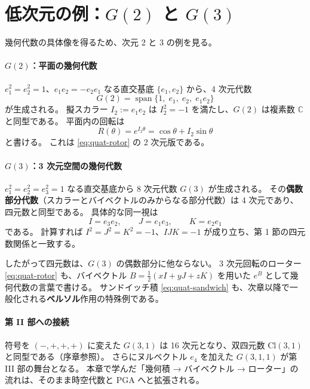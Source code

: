 \documentclass[dvipdfmx,a4paper,oneside]{jsbook}
\numberwithin{equation}{chapter}
\begin{document}
\section{\texorpdfstring{低次元の例：\(G(2)\) と \(G(3)\)}{低次元の例：G(2) と G(3)}}

幾何代数の具体像を得るため、次元 2 と 3 の例を見る。

\paragraph{\(G(2)\)：平面の幾何代数}
\(e_1^2 = e_2^2 = 1\)、\(e_1 e_2 = -e_2 e_1\) なる直交基底 \(\{e_1, e_2\}\) から、4 次元代数
\[
G(2) = \operatorname{span}\{1,\; e_1,\; e_2,\; e_1 e_2\}
\]
が生成される。
擬スカラー \(I_2 := e_1 e_2\) は \(I_2^2 = -1\) を満たし、\(G(2)\) は複素数 \(\mathbb{C}\) と同型である。
平面内の回転は
\begin{equation}
  R(\theta) = e^{I_2 \theta} = \cos\theta + I_2 \sin\theta
\end{equation}
と書ける。
これは \eqref{eq:quat-rotor} の 2 次元版である。

\paragraph{\(G(3)\)：3 次元空間の幾何代数}
\(e_1^2 = e_2^2 = e_3^2 = 1\) なる直交基底から 8 次元代数 \(G(3)\) が生成される。
その\textbf{偶数部分代数}（スカラーとバイベクトルのみからなる部分代数）は 4 次元であり、四元数と同型である。
具体的な同一視は
\begin{equation}
  I = e_3 e_2, \qquad J = e_1 e_3, \qquad K = e_2 e_1
  \label{eq:quat-embedding}
\end{equation}
である。
計算すれば \(I^2 = J^2 = K^2 = -1\)、\(IJK = -1\) が成り立ち、第 1 節の四元数関係と一致する。

したがって四元数は、\(G(3)\) の偶数部分に他ならない。
3 次元回転のローター \eqref{eq:quat-rotor} も、バイベクトル \(B = \tfrac{1}{2}(xI + yJ + zK)\) を用いた \(e^B\) として幾何代数の言葉で書ける。
サンドイッチ積 \eqref{eq:quat-sandwich} も、次章以降で一般化される\textbf{ベルソル}作用の特殊例である。

\paragraph{第 II 部への接続}
符号を \((-,+,+,+)\) に変えた \(G(3,1)\) は 16 次元となり、双四元数 \(\mathrm{Cl}(3,1)\) と同型である（序章参照）。
さらにヌルベクトル \(e_4\) を加えた \(G(3,1,1)\) が第 III 部の舞台となる。
本章で学んだ「幾何積 → バイベクトル → ローター」の流れは、そのまま時空代数と PGA へと拡張される。
\end{document}

